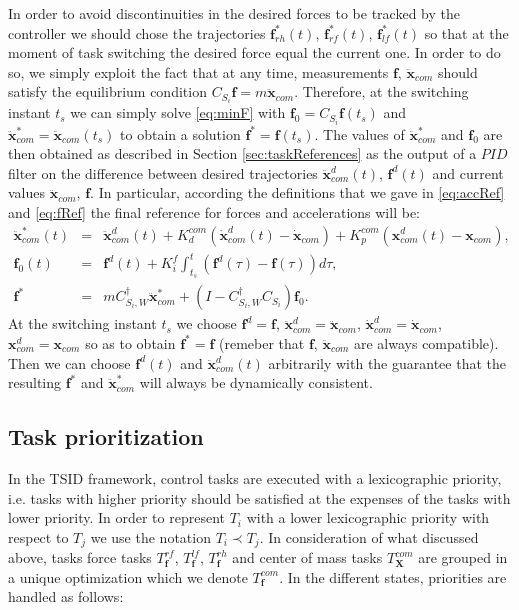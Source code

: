 \documentclass[12pt,a4paper,twoside]{article}
\begin{document}
In order to avoid discontinuities in the desired forces to be tracked by the controller we should chose the trajectories ${{\bm f}}_{rh}^*(t)$, ${{\bm f}}_{rf}^*(t)$, ${{\bm f}}_{lf}^*(t)$ so that at the moment of task switching the desired force equal the current one. In order to do so, we simply exploit the fact that at any time, measurements $\bm f$, $ \ddot {\bm x}_{com}$ should satisfy the equilibrium condition $C_{S_i} \bm f = m \ddot {\bm x}_{com}$. Therefore, at the switching instant $t_s$ we can simply solve \eqref{eq:minF} with $\bm f_0 = C_{S_i} \bm f (t_s) $ and $\ddot {\bm x}^*_{com} = \ddot {\bm x}_{com}(t_s)$ to obtain a solution $\bm f^* = \bm f (t_s)$. The values of $\ddot {\bm x}^*_{com}$ and $\bm f_0$ are then obtained as described in Section \ref{sec:taskReferences} as the output of a $PID$ filter on the difference between desired trajectories $\ddot {\bm x}^d_{com} (t)$, $\bm f^d(t)$ and current values $\ddot {\bm x}_{com}$, $\bm f$. In particular, according the definitions that we gave in \eqref{eq:accRef} and \eqref{eq:fRef} the final reference for forces and accelerations will be:
\begin{eqnarray*} 
\ddot {\bm x}_{com}^* (t) &=& \ddot {\bm x}_{com}^d (t) + K_d^{com} \left( \dot {\bm x}_{com}^d (t) - \dot {\bm x}_{com}\right) + K_p^{com} \left( {\bm x}_{com}^d (t) - {\bm x}_{com}\right), \\
{\bm f}_0 (t) & = & {\bm f}^d (t) + K_i^f \int_{t_s}^t \left( {\bm f}^d (\tau) - {\bm f} (\tau) \right) d \tau,\\
\bm f^* & =&  m  C_{S_i, W}^\dagger \ddot {{\bm x}}_{com}^*+ (I - C_{S_i, W}^\dagger C_{S_i}) \bm f_0.
\end{eqnarray*}
At the switching instant $t_s$ we choose $\bm f^d = \bm f $, $\ddot {\bm x}^d_{com} = \ddot {\bm x}_{com}$, $\dot {\bm x}^d_{com} = \dot {\bm x}_{com}$, $ {\bm x}^d_{com} = {\bm x}_{com}$ so as to obtain $\bm f^* = \bm f$ (remeber that $\bm f$, $ \ddot {\bm x}_{com}$ are always compatible). Then we can choose $\bm f^d (t)$ and $\ddot {\bm x}^d_{com}(t)$ arbitrarily with the guarantee that the resulting $\bm f^*$ and $\ddot {\bm x}_{com}^*$ will always be dynamically consistent.

\subsection{Task prioritization} \label{sec:taskPrioritization}

In the TSID framework, control tasks are executed with a lexicographic priority, i.e. tasks with higher priority should be satisfied at the expenses of the tasks with lower priority. In order to represent $T_i$ with a lower lexicographic priority with respect to $T_j$ we use the notation $T_i \prec T_j$. In consideration of what discussed above, tasks force tasks $T^{rf}_{\bm f}$, $T^{lf}_{\bm f}$, $T^{rh}_{\bm f}$ and center of mass tasks $T^{com}_{\bm X}$ are grouped in a unique optimization which we denote $T^{com}_{\bm f}$. In the different states, priorities are handled as follows:
\end{document}
